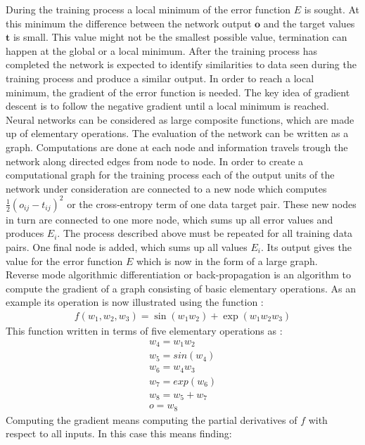 During the training process a local minimum of the error function $E$ is sought. At this minimum the difference between the network output $\mathbf{o}$ and the target values $\mathbf{t}$ is small. This value might not be the smallest possible value, termination can happen at the global or a local minimum.
After the training process has completed the network is expected to identify similarities to data seen during the training process and produce a similar output.
In order to reach a local minimum, the gradient of the error function is needed. The key idea of gradient descent is to follow the negative gradient until a local minimum is reached.
Neural networks can be considered as large composite functions, which are made up of elementary operations. The evaluation of the network can be written as a graph. Computations are done at each node and information travels trough the network along directed edges from node to node. In order to create a computational graph for the training process each of the output units of the network under consideration are connected to a new node which computes $\frac{1}{2}(o_{ij} - t_{ij})^2$\cite[page 157]{Rojas1996} or the cross-entropy term of one data target pair. These new nodes in turn are connected to one more node, which sums up all error values and produces $E_i$. The process described above must be repeated for all training data pairs. One final node is added, which sums up all values $E_i$. Its output gives the value for the error function $E$ which is now in the form of a large graph.\\
Reverse mode algorithmic differentiation or back-propagation is an algorithm to compute the gradient of a graph consisting of basic elementary operations. As an example its operation is now illustrated using the function \cite[page 69]{Diehl2013}:
\begin{align}
f(w_1,w_2,w_3) = \sin(w_1 w_2) + \exp(w_1 w_2 w_3)
\label{eq:backFun}
\end{align}
This function written in terms of five elementary operations as \cite[page 70]{Diehl2013}:
\begin{align}
w_4 = w_1 w_2 \\
w_5 = sin(w_4)\\
w_6 = w_4 w_3 \\
w_7 = exp(w_6) \\
w_8 = w_5 + w_7 \\
o = w_8
\end{align}
Computing the gradient means computing the partial derivatives of $f$ with respect to all inputs. In this case this means finding:
